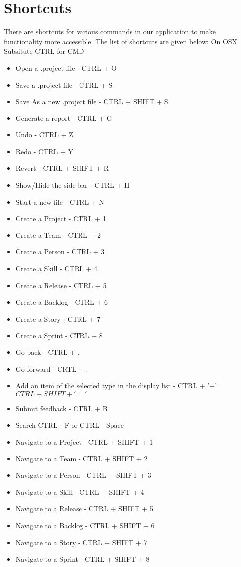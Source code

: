 \section{Shortcuts}

There are shortcuts for various commands in our application to make functionality more accessible. The list of shortcuts are given below:
On OSX Subsitute CTRL for CMD

\begin{itemize}
\item Open a .project file - CTRL + O
\item Save a .project file - CTRL + S
\item Save As a new .project file - CTRL + SHIFT + S
\item Generate a report - CTRL + G
\item Undo - CTRL + Z
\item Redo - CTRL + Y
\item Revert - CTRL + SHIFT + R
\item Show/Hide the side bar - CTRL + H
\item Start a new file - CTRL + N
\item Create a Project - CTRL + 1
\item Create a Team - CTRL + 2
\item Create a Person - CTRL + 3
\item Create a Skill - CTRL + 4
\item Create a Release - CTRL + 5
\item Create a Backlog - CTRL + 6
\item Create a Story - CTRL + 7
\item Create a Sprint - CTRL + 8
\item Go back - CTRL + ,
\item Go forward - CRTL + .
\item Add an item of the selected type in the display list - CTRL + '+' \(CTRL + SHIFT + '='\)
\item Submit feedback - CTRL + B
\item Search CTRL - F  or CTRL - Space
\item Navigate to a Project - CTRL + SHIFT + 1
\item Navigate to a Team - CTRL + SHIFT + 2
\item Navigate to a Person - CTRL + SHIFT + 3
\item Navigate to a Skill - CTRL + SHIFT + 4
\item Navigate to a Release - CTRL + SHIFT + 5
\item Navigate to a Backlog - CTRL + SHIFT + 6
\item Navigate to a Story - CTRL + SHIFT + 7
\item Navigate to a Sprint - CTRL + SHIFT + 8
\end{itemize}
